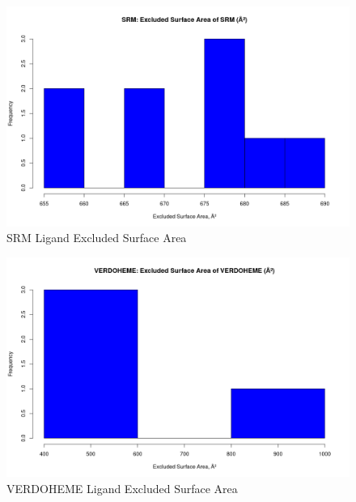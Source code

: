 	\begin{figure}
		\caption{SRM Ligand Excluded Surface Area}
		\label{figs:SRM_ligandExcSA}
		\includegraphics[width=\linewidth]{7A/SRM_ligandExcSA}
	\end{figure}

	\begin{figure}
		\caption{VERDOHEME Ligand Excluded Surface Area}
		\label{figs:VERDOHEME_ligandExcSA}
		\includegraphics[width=\linewidth]{7A/VERDOHEME_ligandExcSA}
	\end{figure}

